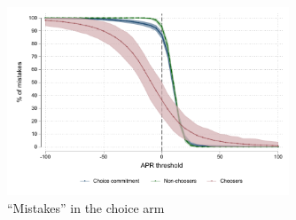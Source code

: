 \documentclass[oneside,11pt]{article}
\begin{document}
\begin{figure}[H]
    \caption{``Mistakes'' in the choice arm}
    \label{choose_wrong}
        \centering
        \includegraphics[width=0.75\textwidth]{Figuras/line_cw_apr_tot_tut.pdf}
        
    

\end{figure}
\end{document}
